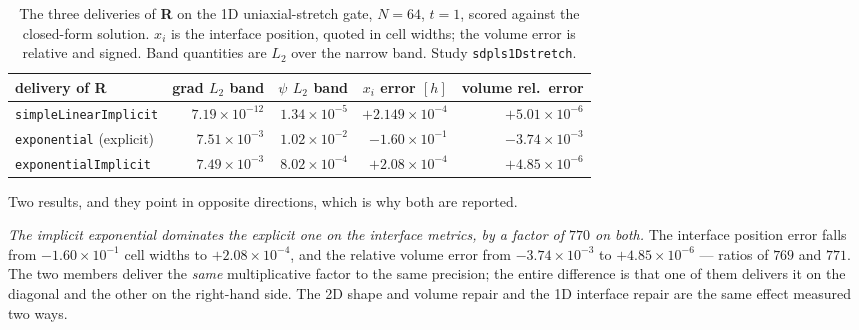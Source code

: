 \documentclass[preprint,3p,11pt]{elsarticle}
\newcommand{\psilev}{\psi}
\begin{document}
\begin{table}[htbp]
\centering
\caption{The three deliveries of \textbf{R} on the 1D uniaxial-stretch gate,
$N=64$, $t=1$, scored against the closed-form solution. $x_i$ is the interface
position, quoted in cell widths; the volume error is relative and signed. Band
quantities are $L_2$ over the narrow band. Study \texttt{sdpls1Dstretch}.}
\label{tab:expimplicit1d}
\small
\begin{tabular}{lrrrr}
\toprule
delivery of \textbf{R} & grad $L_2$ band & $\psilev$ $L_2$ band & $x_i$ error $[h]$ & volume rel.\ error \\
\midrule
\texttt{simpleLinearImplicit}   & $7.19\times10^{-12}$ & $1.34\times10^{-5}$ & $+2.149\times10^{-4}$ & $+5.01\times10^{-6}$ \\
\texttt{exponential} (explicit) & $7.51\times10^{-3}$  & $1.02\times10^{-2}$ & $-1.60\times10^{-1}$  & $-3.74\times10^{-3}$ \\
\texttt{exponentialImplicit}    & $7.49\times10^{-3}$  & $8.02\times10^{-4}$ & $+2.08\times10^{-4}$  & $+4.85\times10^{-6}$ \\
\bottomrule
\end{tabular}
\end{table}

Two results, and they point in opposite directions, which is why both are
reported.

\emph{The implicit exponential dominates the explicit one on the interface
metrics, by a factor of $770$ on both.} The interface position error falls from
$-1.60\times10^{-1}$ cell widths to $+2.08\times10^{-4}$, and the relative volume
error from $-3.74\times10^{-3}$ to $+4.85\times10^{-6}$ --- ratios of $769$ and
$771$. The two members deliver the \emph{same} multiplicative factor to the same
precision; the entire difference is that one of them delivers it on the diagonal
and the other on the right-hand side. The 2D shape and volume repair and the 1D
interface repair are the same effect measured two ways.
\end{document}

